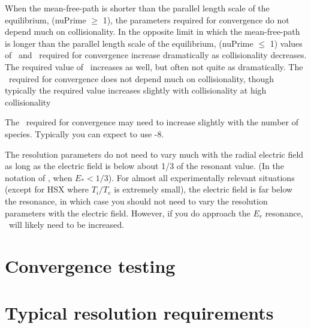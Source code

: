 When the mean-free-path is shorter than the parallel length scale of the equilibrium,
({\ttfamily nuPrime} $\ge$ 1), the parameters required for convergence
do not depend much on collisionality. In the opposite
limit in which the mean-free-path is longer than the parallel length scale of the equilibrium,
({\ttfamily nuPrime} $\le$ 1)
values of
\Nzeta~and \Nxi~required for convergence increase dramatically
as collisionality decreases. The required value of \Ntheta~increases as well, but often
not quite as dramatically. The \Nx~required for convergence does not depend
much on collisionality, though typically the required value increases
slightly with collisionality at high collisionality

The \Nx~required for convergence may need to increase slightly with the number of species.
Typically you can expect to use -8.

The resolution parameters do not need to vary much with the radial
electric field as long as the electric field is below about 1/3 of the resonant value.
(In the notation of \cite{sfincsPaper}, when $E_*<1/3$).
For almost all experimentally relevant situations (except for HSX where $T_i/T_e$ is extremely small),
the electric field is far below the resonance, in which case you should not need to vary the resolution
parameters with the electric field.
However, if you do approach the $E_r$ resonance, \Nx~will likely need to be increased.

\section{Convergence testing}
\label{sec:convergence}

\section{Typical resolution requirements}

